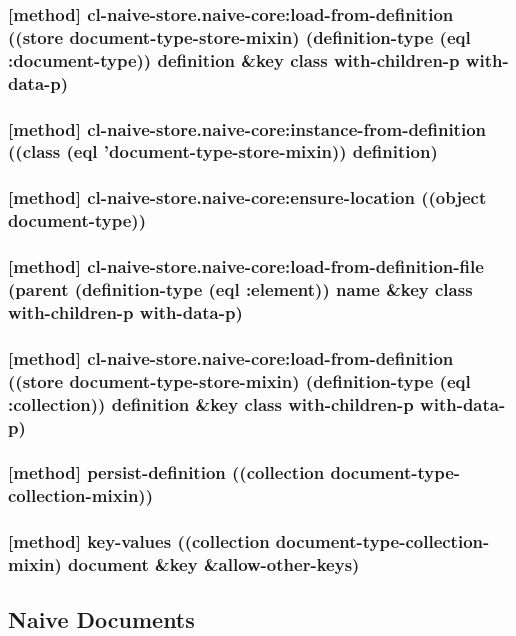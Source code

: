\documentclass[11pt]{article}
\begin{document}
\subsubsection{[method] cl-naive-store.naive-core:load-from-definition ((store document-type-store-mixin) (definition-type (eql :document-type)) definition \&key class with-children-p with-data-p)}
\label{sec:org9bd16d7}

\subsubsection{[method] cl-naive-store.naive-core:instance-from-definition ((class (eql 'document-type-store-mixin)) definition)}
\label{sec:org31cde7d}

\subsubsection{[method] cl-naive-store.naive-core:ensure-location ((object document-type))}
\label{sec:org7bfded2}

\subsubsection{[method] cl-naive-store.naive-core:load-from-definition-file (parent (definition-type (eql :element)) name \&key class with-children-p with-data-p)}
\label{sec:org57aad9f}

\subsubsection{[method] cl-naive-store.naive-core:load-from-definition ((store document-type-store-mixin) (definition-type (eql :collection)) definition \&key class with-children-p with-data-p)}
\label{sec:orgf8fa41a}

\subsubsection{[method] persist-definition ((collection document-type-collection-mixin))}
\label{sec:orgd21477f}

\subsubsection{[method] key-values ((collection document-type-collection-mixin) document \&key \&allow-other-keys)}
\label{sec:orge82df63}

\subsection{Naive Documents}
\label{sec:org7f5d505}
\end{document}
